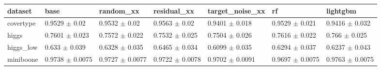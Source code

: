 \begin{tabular}{lllllll}
\toprule
dataset & base & random\_xx & residual\_xx & target\_noise\_xx & rf & lightgbm \\
\midrule
covertype & 0.9529 $\pm$ 0.02 & 0.9532 $\pm$ 0.02 & 0.9563 $\pm$ 0.02 & 0.9401 $\pm$ 0.018 & 0.9529 $\pm$ 0.021 & 0.9416 $\pm$ 0.032 \\
higgs & 0.7601 $\pm$ 0.023 & 0.7572 $\pm$ 0.022 & 0.7532 $\pm$ 0.025 & 0.7504 $\pm$ 0.026 & 0.7616 $\pm$ 0.022 & 0.766 $\pm$ 0.025 \\
higgs\_low & 0.633 $\pm$ 0.039 & 0.6328 $\pm$ 0.035 & 0.6465 $\pm$ 0.034 & 0.6099 $\pm$ 0.035 & 0.6294 $\pm$ 0.037 & 0.6237 $\pm$ 0.043 \\
miniboone & 0.9738 $\pm$ 0.0075 & 0.9727 $\pm$ 0.0077 & 0.9722 $\pm$ 0.0078 & 0.9702 $\pm$ 0.0091 & 0.9697 $\pm$ 0.0075 & 0.9763 $\pm$ 0.0075 \\
\bottomrule
\end{tabular}
